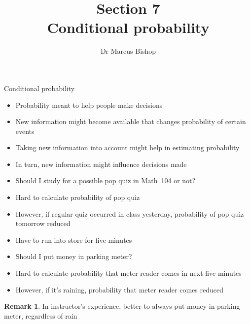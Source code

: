 \documentclass[handout]{beamer}
\title[\S7]{Section 7\\Conditional probability}
\author{Dr Marcus Bishop}
\theoremstyle{definition}
\newtheorem{remark}{Remark}
\begin{document}
\begin{frame}\titlepage\end{frame}
\LogoOff

\begin{frame}{Conditional probability}
\begin{itemize}
\item Probability meant to help people make decisions
\item New information might become available
that changes probability of certain events
\item Taking new information into account
might help in estimating probability
\item In turn, new information might influence decisions made
\end{itemize}
\begin{example}
\begin{itemize}
\item Should I study for a possible pop quiz in Math~104 or not?
\item Hard to calculate probability of pop quiz
\item However, if regular quiz occurred in class yesterday,
probability of pop quiz tomorrow reduced
\end{itemize}
\end{example}
\end{frame}

\begin{frame}
\begin{example}
\begin{itemize}
\item Have to run into store for five minutes
\item Should I put money in parking meter?
\item Hard to calculate probability that meter reader
comes in next five minutes
\item However, if it's raining, probability that meter reader
comes reduced
\end{itemize}
\end{example}
\begin{remark}
In instructor's experience, better to always put money
in parking meter, regardless of rain
\end{remark}
\end{frame}
\end{document}
